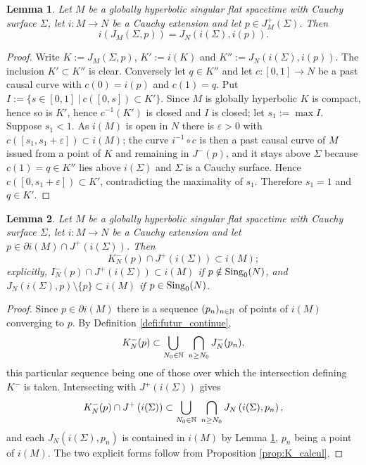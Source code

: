 \documentclass[a4paper,twoside]{article}
\newtheorem{lem}{Lemma}[section]
\begin{document}
\begin{lem}\label{lem:image_diamant}
Let $M$ be a globally hyperbolic singular flat spacetime with Cauchy surface $\Sigma$, let
$i:M\rightarrow N$ be a Cauchy extension and let $p\in J^+_M(\Sigma)$. Then
$$i\left(J_M(\Sigma,p)\right)=J_N\left(i(\Sigma),i(p)\right).$$
\end{lem}
\begin{proof}
Write $K:=J_M(\Sigma,p)$, $K':=i(K)$ and $K'':=J_N(i(\Sigma),i(p))$. The inclusion $K'\subset K''$ is
clear. Conversely let $q\in K''$ and let $c:[0,1]\rightarrow N$ be a past causal curve with
$c(0)=i(p)$ and $c(1)=q$. Put $I:=\{s\in[0,1] ~|~ c([0,s])\subset K'\}$. Since $M$ is globally
hyperbolic $K$ is compact, hence so is $K'$, hence $c^{-1}(K')$ is closed and $I$ is closed; let
$s_1:=\max I$. Suppose $s_1<1$. As $i(M)$ is open in $N$ there is $\varepsilon>0$ with
$c\left([s_1,s_1+\varepsilon]\right)\subset i(M)$; the curve $i^{-1}\circ c$ is then a past causal
curve of $M$ issued from a point of $K$ and remaining in $J^-(p)$, and it stays above $\Sigma$
because $c(1)=q\in K''$ lies above $i(\Sigma)$ and $\Sigma$ is a Cauchy surface. Hence
$c\left([0,s_1+\varepsilon]\right)\subset K'$, contradicting the maximality of $s_1$. Therefore
$s_1=1$ and $q\in K'$.
\end{proof}

\begin{lem}\label{lem:passe_pgcd}
Let $M$ be a globally hyperbolic singular flat spacetime with Cauchy surface $\Sigma$, let
$i:M\rightarrow N$ be a Cauchy extension and let $p\in \partial i(M)\cap J^+\left(i(\Sigma)\right)$.
Then
$$K^-_N(p)\cap J^+\left(i(\Sigma)\right)\subset i(M);$$
explicitly, $I^-_N(p)\cap J^+\left(i(\Sigma)\right)\subset i(M)$ if $p\notin \mathrm{Sing}_0(N)$, and
$J_N\left(i(\Sigma),p\right)\setminus \{p\}\subset i(M)$ if $p\in \mathrm{Sing}_0(N)$.
\end{lem}
\begin{proof}
Since $p\in \partial i(M)$ there is a sequence $(p_n)_{n\in \mathbb{N}}$ of points of $i(M)$ converging to
$p$. By Definition \ref{defi:futur_continue},
$$K^-_N(p)\subset \bigcup_{N_0\in \N}\ \bigcap_{n\geq N_0} J^-_N(p_n),$$
this particular sequence being one of those over which the intersection defining $K^-$ is taken.
Intersecting with $J^+\left(i(\Sigma)\right)$ gives
$$K^-_N(p)\cap J^+\left(i(\Sigma)\right)\subset \bigcup_{N_0\in \mathbb{N}}\ \bigcap_{n\geq N_0}
J_N\left(i(\Sigma),p_n\right),$$
and each $J_N\left(i(\Sigma),p_n\right)$ is contained in $i(M)$ by Lemma \ref{lem:image_diamant},
$p_n$ being a point of $i(M)$. The two explicit forms follow from Proposition \ref{prop:K_calcul}.
\end{proof}
\end{document}
